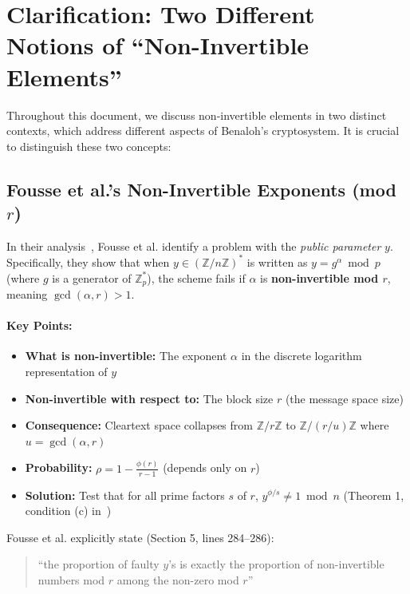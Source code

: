 \documentclass[11pt]{article}
\theoremstyle{definition}
\begin{document}
\appendix

\section{Clarification: Two Different Notions of ``Non-Invertible Elements''}

Throughout this document, we discuss non-invertible elements in two distinct contexts, 
which address different aspects of Benaloh's cryptosystem. It is crucial to distinguish 
these two concepts:

\subsection{Fousse et al.'s Non-Invertible Exponents (mod $r$)}

In their analysis~\cite{fousse2011benaloh}, Fousse et al. identify a problem with the 
\emph{public parameter} $y$. Specifically, they show that when $y \in (\mathbb{Z}/n\mathbb{Z})^*$ 
is written as $y = g^\alpha \bmod{p}$ (where $g$ is a generator of $\mathbb{Z}_p^*$), 
the scheme fails if $\alpha$ is \textbf{non-invertible mod $r$}, meaning $\gcd(\alpha, r) > 1$.

\paragraph{Key Points:}
\begin{itemize}
\item \textbf{What is non-invertible:} The exponent $\alpha$ in the discrete logarithm 
  representation of $y$
\item \textbf{Non-invertible with respect to:} The block size $r$ (the message space size)
\item \textbf{Consequence:} Cleartext space collapses from $\mathbb{Z}/r\mathbb{Z}$ 
  to $\mathbb{Z}/(r/u)\mathbb{Z}$ where $u = \gcd(\alpha, r)$
\item \textbf{Probability:} $\rho = 1 - \frac{\phi(r)}{r-1}$ (depends only on $r$)
\item \textbf{Solution:} Test that for all prime factors $s$ of $r$, 
  $y^{\phi/s} \neq 1 \bmod{n}$ (Theorem 1, condition (c) in~\cite{fousse2011benaloh})
\end{itemize}

Fousse et al. explicitly state (Section 5, lines 284--286):
\begin{quote}
``the proportion of faulty $y$'s is exactly the proportion of non-invertible numbers mod $r$ 
among the non-zero mod $r$''
\end{quote}
\end{document}
